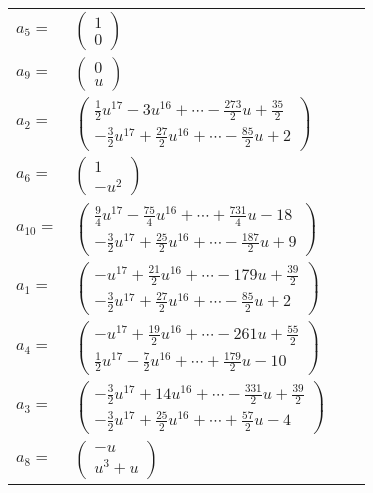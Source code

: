 \documentclass[1p]{elsarticle_modified}
\theoremstyle{definition}
\begin{document}
\begin{tabular}{m{7pt} m{180pt} m{7pt} m{180pt} }
\flushright $a_{5}=$&$\begin{pmatrix}1\\0\end{pmatrix}$ \\
\flushright $a_{9}=$&$\begin{pmatrix}0\\u\end{pmatrix}$ \\
\flushright $a_{2}=$&$\begin{pmatrix}\frac{1}{2} u^{17}-3 u^{16}+\cdots-\frac{273}{2} u+\frac{35}{2}\\-\frac{3}{2} u^{17}+\frac{27}{2} u^{16}+\cdots-\frac{85}{2} u+2\end{pmatrix}$ \\
\flushright $a_{6}=$&$\begin{pmatrix}1\\- u^2\end{pmatrix}$ \\
\flushright $a_{10}=$&$\begin{pmatrix}\frac{9}{4} u^{17}-\frac{75}{4} u^{16}+\cdots+\frac{731}{4} u-18\\-\frac{3}{2} u^{17}+\frac{25}{2} u^{16}+\cdots-\frac{187}{2} u+9\end{pmatrix}$ \\
\flushright $a_{1}=$&$\begin{pmatrix}- u^{17}+\frac{21}{2} u^{16}+\cdots-179 u+\frac{39}{2}\\-\frac{3}{2} u^{17}+\frac{27}{2} u^{16}+\cdots-\frac{85}{2} u+2\end{pmatrix}$ \\
\flushright $a_{4}=$&$\begin{pmatrix}- u^{17}+\frac{19}{2} u^{16}+\cdots-261 u+\frac{55}{2}\\\frac{1}{2} u^{17}-\frac{7}{2} u^{16}+\cdots+\frac{179}{2} u-10\end{pmatrix}$ \\
\flushright $a_{3}=$&$\begin{pmatrix}-\frac{3}{2} u^{17}+14 u^{16}+\cdots-\frac{331}{2} u+\frac{39}{2}\\-\frac{3}{2} u^{17}+\frac{25}{2} u^{16}+\cdots+\frac{57}{2} u-4\end{pmatrix}$ \\
\flushright $a_{8}=$&$\begin{pmatrix}- u\\u^3+u\end{pmatrix}$ \\

\end{tabular}
\end{document}
